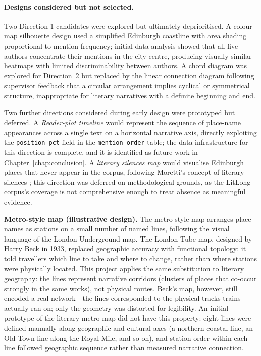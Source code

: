 \documentclass[logo,msc]{infthesis}
\begin{document}
\paragraph{Designs considered but not selected.} Two Direction-1 candidates were explored but ultimately deprioritised. A colour map silhouette design used a simplified Edinburgh coastline with area shading proportional to mention frequency; initial data analysis showed that all five authors concentrate their mentions in the city centre, producing visually similar heatmaps with limited discriminability between authors. A chord diagram was explored for Direction~2 but replaced by the linear connection diagram following supervisor feedback that a circular arrangement implies cyclical or symmetrical structure, inappropriate for literary narratives with a definite beginning and end.

Two further directions considered during early design were prototyped but deferred. A \emph{Reader-plot timeline} would represent the sequence of place-name appearances across a single text on a horizontal narrative axis, directly exploiting the \texttt{position\_pct} field in the \texttt{mention\_order} table; the data infrastructure for this direction is complete, and it is identified as future work in Chapter~\ref{chap:conclusion}. A \emph{literary silences map} would visualise Edinburgh places that never appear in the corpus, following Moretti's concept of literary silences \cite{moretti2005}; this direction was deferred on methodological grounds, as the LitLong corpus's coverage is not comprehensive enough to treat absence as meaningful evidence.
 
\textbf{Metro-style map (illustrative design).} The metro-style map arranges place names as stations on a small number of named lines, following the visual language of the London Underground map. The London Tube map, designed by Harry Beck in 1933, replaced geographic accuracy with functional topology: it told travellers which line to take and where to change, rather than where stations were physically located. This project applies the same substitution to literary geography: the lines represent narrative corridors (clusters of places that co-occur strongly in the same works), not physical routes. Beck's map, however, still encoded a real network---the lines corresponded to the physical tracks trains actually ran on; only the geometry was distorted for legibility. An initial prototype of the literary metro map did not have this property: eight lines were defined manually along geographic and cultural axes (a northern coastal line, an Old Town line along the Royal Mile, and so on), and station order within each line followed geographic sequence rather than measured narrative connection.
\end{document}
